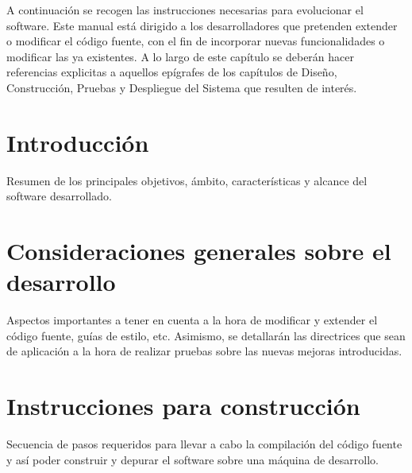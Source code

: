 
A continuación se recogen las instrucciones necesarias para evolucionar el software. Este manual está dirigido a los desarrolladores que pretenden extender o modificar el código fuente, con el fin de incorporar nuevas funcionalidades o modificar las ya existentes. A lo largo de este capítulo se deberán hacer referencias explicitas a aquellos epígrafes de los capítulos de Diseño, Construcción, Pruebas y Despliegue del Sistema que resulten de interés.

\section{Introducción}
Resumen de los principales objetivos, ámbito, características y alcance del software desarrollado.



\section{Consideraciones generales sobre el desarrollo}
Aspectos importantes a tener en cuenta a la hora de modificar y extender el código fuente, guías de estilo, etc. Asimismo, se detallarán las directrices que sean de aplicación a la hora de realizar pruebas sobre las nuevas mejoras introducidas.

\section{Instrucciones para construcción}
Secuencia de pasos requeridos para llevar a cabo la compilación del código fuente y así poder construir y depurar el software sobre una máquina de desarrollo.
